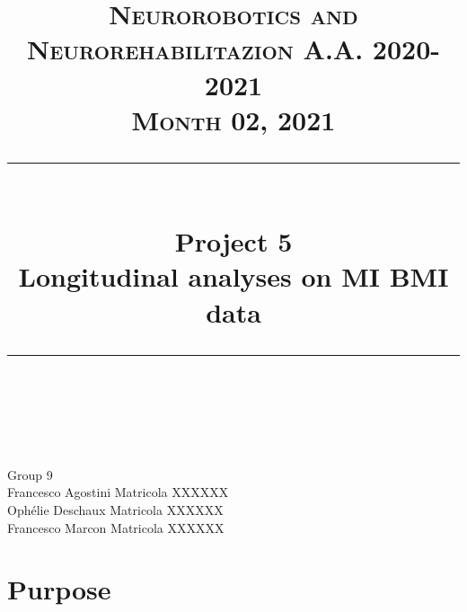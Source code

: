 \documentclass{article} %
\title{
\normalfont \normalsize 
\textsc{Neurorobotics and Neurorehabilitazion A.A. 2020-2021\\
Month 02, 2021 } \\
[10pt] 
\rule{\linewidth}{0.5pt} \\[6pt] 
\huge Project 5 \\ Longitudinal analyses on MI BMI data \\
\rule{\linewidth}{2pt}  \\[10pt]
}
\begin{document}
\huge \centering
\maketitle Group 9 \\


\noindent 
Francesco Agostini \dotfill Matricola XXXXXX \\
Ophélie Deschaux \dotfill Matricola XXXXXX \\
Francesco Marcon \dotfill Matricola XXXXXX \\



%
%
%
%





\section{Purpose}
 




\end{document}
